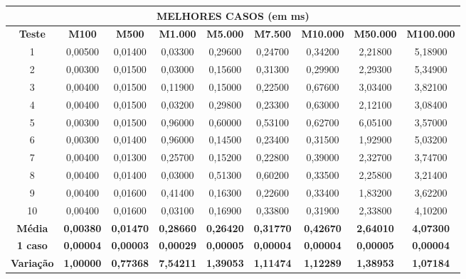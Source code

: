 \documentclass[a4paper, 12pt]{article}
\begin{document}
\begin{tabular}{ccccccccc}

                                                                 \multicolumn{ 9}{c}{{\bf MELHORES CASOS (em ms)}} \\
\hline
{\bf Teste} & {\bf M100} & {\bf M500} & {\bf M1.000} & {\bf M5.000} & {\bf M7.500} & {\bf M10.000} & {\bf M50.000} & {\bf M100.000} \\
\hline
         1 &    0,00500 &    0,01400 &    0,03300 &    0,29600 &    0,24700 &    0,34200 &    2,21800 &    5,18900 \\
\hline
         2 &    0,00300 &    0,01500 &    0,03000 &    0,15600 &    0,31300 &    0,29900 &    2,29300 &    5,34900 \\
\hline
         3 &    0,00400 &    0,01500 &    0,11900 &    0,15000 &    0,22500 &    0,67600 &    3,03400 &    3,82100 \\
\hline
         4 &    0,00400 &    0,01500 &    0,03200 &    0,29800 &    0,23300 &    0,63000 &    2,12100 &    3,08400 \\
\hline
         5 &    0,00300 &    0,01500 &    0,96000 &    0,60000 &    0,53100 &    0,62700 &    6,05100 &    3,57000 \\
\hline
         6 &    0,00300 &    0,01400 &    0,96000 &    0,14500 &    0,23400 &    0,31500 &    1,92900 &    5,03200 \\
\hline
         7 &    0,00400 &    0,01300 &    0,25700 &    0,15200 &    0,22800 &    0,39000 &    2,32700 &    3,74700 \\
\hline
         8 &    0,00400 &    0,01400 &    0,03000 &    0,51300 &    0,60200 &    0,33500 &    2,25800 &    3,21400 \\
\hline
         9 &    0,00400 &    0,01600 &    0,41400 &    0,16300 &    0,22600 &    0,33400 &    1,83200 &    3,62200 \\
\hline
        10 &    0,00400 &    0,01600 &    0,03100 &    0,16900 &    0,33800 &    0,31900 &    2,33800 &    4,10200 \\
\hline
{\bf Média} & {\bf 0,00380} & {\bf 0,01470} & {\bf 0,28660} & {\bf 0,26420} & {\bf 0,31770} & {\bf 0,42670} & {\bf 2,64010} & {\bf 4,07300} \\
\hline
{\bf 1 caso} & {\bf 0,00004} & {\bf 0,00003} & {\bf 0,00029} & {\bf 0,00005} & {\bf 0,00004} & {\bf 0,00004} & {\bf 0,00005} & {\bf 0,00004} \\
\hline
{\bf Variação} & {\bf 1,00000} & {\bf 0,77368} & {\bf 7,54211} & {\bf 1,39053} & {\bf 1,11474} & {\bf 1,12289} & {\bf 1,38953} & {\bf 1,07184} \\
\hline
\end{tabular}  
\vspace{0.3cm}
\end{document}
